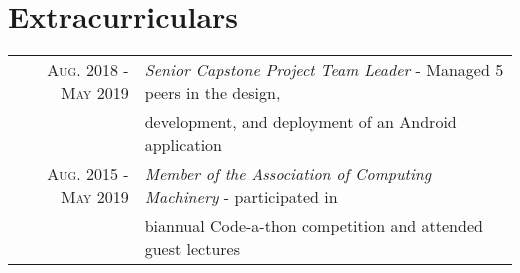 \documentclass[letterpaper,10pt]{article}
\begin{document}
\section{\textcolor{HeaderColor}{Extracurriculars}}
\begin{tabular}{r|l}
 \textsc{Aug.} 2018 - \textsc{May} 2019  &  \emph{\textcolor{HeaderColor}{Senior Capstone Project Team Leader}} - Managed 5 peers in the design, \\& development, and deployment of an Android application 
\\
 \textsc{Aug.} 2015 - \textsc{May} 2019   & \emph{\textcolor{HeaderColor}{Member of the Association of Computing Machinery}} - participated in \\& biannual Code-a-thon competition and attended guest lectures \\
\end{tabular}


\end{document}

